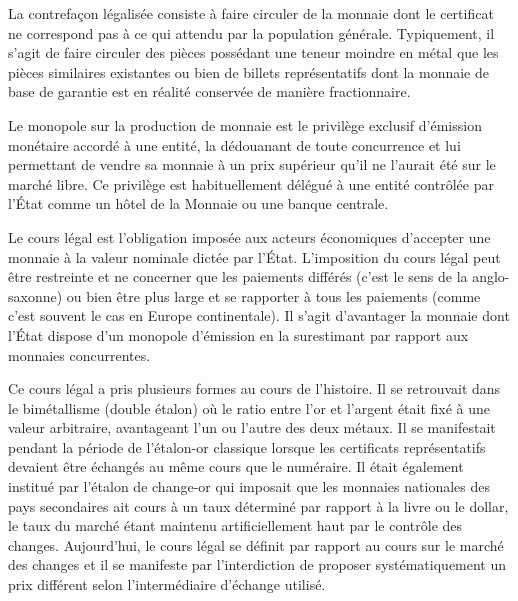 La contrefaçon légalisée consiste à faire circuler de la monnaie dont le certificat ne correspond pas à ce qui attendu par la population générale. Typiquement, il s'agit de faire circuler des pièces possédant une teneur moindre en métal que les pièces similaires existantes ou bien de billets représentatifs dont la monnaie de base de garantie est en réalité conservée de manière fractionnaire.

Le monopole sur la production de monnaie est le privilège exclusif d'émission monétaire accordé à une entité, la dédouanant de toute concurrence et lui permettant de vendre sa monnaie à un prix supérieur qu'il ne l'aurait été sur le marché libre. Ce privilège est habituellement délégué à une entité contrôlée par l'État comme un hôtel de la Monnaie ou une banque centrale. %

Le cours légal est l'obligation imposée aux acteurs économiques d'accepter une monnaie à la valeur nominale dictée par l'État. L'imposition du cours légal peut être restreinte et ne concerner que les paiements différés (c'est le sens de la  anglo-saxonne) ou bien être plus large et se rapporter à tous les paiements (comme c'est souvent le cas en Europe continentale). Il s'agit d'avantager la monnaie dont l'État dispose d'un monopole d'émission en la surestimant par rapport aux monnaies concurrentes.

Ce cours légal a pris plusieurs formes au cours de l'histoire. Il se retrouvait dans le bimétallisme (double étalon) où le ratio entre l'or et l'argent était fixé à une valeur arbitraire, avantageant l'un ou l'autre des deux métaux. Il se manifestait pendant la période de l'étalon-or classique lorsque les certificats représentatifs devaient être échangés au même cours que le numéraire. Il était également institué par l'étalon de change-or qui imposait que les monnaies nationales des pays secondaires ait cours à un taux déterminé par rapport à la livre ou le dollar, le taux du marché étant maintenu artificiellement haut par le contrôle des changes. Aujourd'hui, le cours légal se définit par rapport au cours sur le marché des changes et il se manifeste par l'interdiction de proposer systématiquement un prix différent selon l'intermédiaire d'échange utilisé. %


